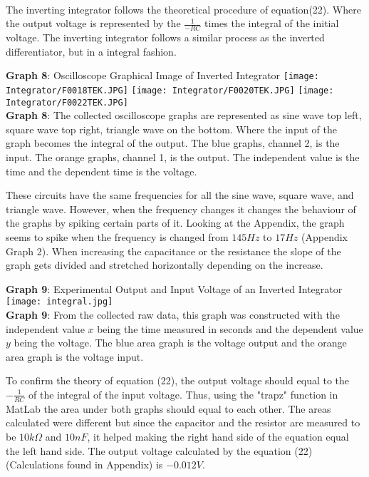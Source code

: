 \documentclass[11pt]{article}
\begin{document}
\\The inverting integrator follows the theoretical procedure of equation(22). Where the output voltage is represented by the $\frac{1}{-RC}$ times the integral of the initial voltage. The inverting integrator follows a similar process as the inverted differentiator, but in a integral fashion.
\newpage
\begin{center}
    \textbf{Graph 8}: Oscilloscope Graphical Image of Inverted Integrator
    \texttt{[image: Integrator/F0018TEK.JPG]}
    \texttt{[image: Integrator/F0020TEK.JPG]}
    \texttt{[image: Integrator/F0022TEK.JPG]}\\\textbf{Graph 8}: The collected oscilloscope graphs are represented as sine wave top left, square wave top right, triangle wave on the bottom. Where the input of the graph becomes the integral of the output. The blue graphs, channel 2, is the input. The orange graphs, channel 1, is the output. The independent value is the time and the dependent time is the voltage. 
\end{center}
These circuits have the same frequencies for all the sine wave, square wave, and triangle wave. However, when the frequency changes it changes the behaviour of the graphs by spiking certain parts of it. Looking at the Appendix, the graph seems to spike when the frequency is changed from $145 Hz$ to $17Hz$ (Appendix Graph 2). When increasing the capacitance or the resistance the slope of the graph gets divided and stretched horizontally depending on the increase.
\newpage
\begin{center}
    \textbf{Graph 9}: Experimental Output and Input Voltage of an Inverted Integrator\\
    \texttt{[image: integral.jpg]}\\\textbf{Graph 9}: From the collected raw data, this graph was constructed with the independent value $x$ being the time measured in seconds and the dependent value $y$ being the voltage. The blue area graph is the voltage output and the orange area graph is the voltage input. 
\end{center}
To confirm the theory of equation (22), the output voltage should equal to the $-\frac{1}{RC}$ of the integral of the input voltage. Thus, using the "trapz" function in MatLab the area under both graphs should equal to each other. The areas calculated were different but since the capacitor and the resistor are measured to be $10k\Omega$ and $10nF$, it helped making the right hand side of the equation equal the left hand side. The output voltage calculated by the equation (22) (Calculations found in Appendix) is $-0.012V$. 
\end{document}
